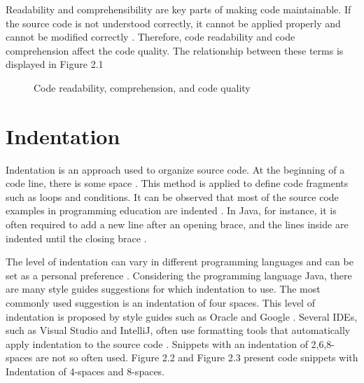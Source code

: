 Readability and comprehensibility are key parts of making code maintainable. 
If the source code is not understood correctly, it cannot be applied properly and cannot be modified correctly \cite{izu2025introducing}. Therefore, code readability and code comprehension affect the code quality. The relationship between these terms is displayed in Figure 2.1




\begin{figure}[H]
\centering
{}
\caption{Code readability, comprehension, and code quality}
\label{fig:readability-comprehension-quality}
\end{figure}



\section{Indentation}

Indentation is an approach used to organize source code. At the beginning of a code line, there is some space \cite{morzeck2023indentation}.
This method is applied to define code fragments such as loops and conditions.  It can be observed that most of the source code examples in programming education are indented \cite{morzeck2023indentation}. In Java, for instance, it is often required to add a new line after an opening brace, and the lines inside are indented until the closing brace \cite{hanenberg2024indentation}.


The level of indentation can vary in different programming languages and can be set as a personal preference \cite{bauer2017indentations}. Considering the programming language Java, there are many style guides suggestions for which indentation to use. The most commonly used suggestion is an indentation of four spaces. This level of indentation is proposed by style guides such as Oracle and Google \cite{bauer2017indentations}.
Several IDEs, such as Visual Studio and IntelliJ, often use formatting tools that automatically apply indentation to the source code \cite{morzeck2023indentation}. Snippets with an indentation  of 2,6,8-spaces are not so often used. Figure 2.2 and Figure 2.3 present code snippets with Indentation of 4-spaces and 8-spaces.

